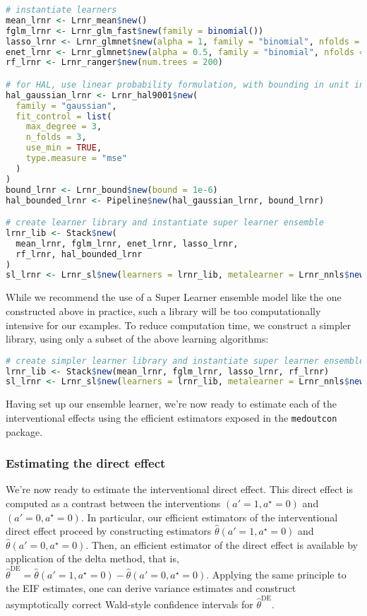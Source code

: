 \documentclass[
  12pt,
]{book}
\newcommand{\passthrough}[1]{#1}
\theoremstyle{definition}
\theoremstyle{definition}
\theoremstyle{definition}
\newcommand{\1}{\mathbbm{1}}
\begin{document}
\begin{lstlisting}[language=R]
# instantiate learners
mean_lrnr <- Lrnr_mean$new()
fglm_lrnr <- Lrnr_glm_fast$new(family = binomial())
lasso_lrnr <- Lrnr_glmnet$new(alpha = 1, family = "binomial", nfolds = 3)
enet_lrnr <- Lrnr_glmnet$new(alpha = 0.5, family = "binomial", nfolds = 3)
rf_lrnr <- Lrnr_ranger$new(num.trees = 200)

# for HAL, use linear probability formulation, with bounding in unit interval
hal_gaussian_lrnr <- Lrnr_hal9001$new(
  family = "gaussian",
  fit_control = list(
    max_degree = 3,
    n_folds = 3,
    use_min = TRUE,
    type.measure = "mse"
  )
)
bound_lrnr <- Lrnr_bound$new(bound = 1e-6)
hal_bounded_lrnr <- Pipeline$new(hal_gaussian_lrnr, bound_lrnr)

# create learner library and instantiate super learner ensemble
lrnr_lib <- Stack$new(
  mean_lrnr, fglm_lrnr, enet_lrnr, lasso_lrnr,
  rf_lrnr, hal_bounded_lrnr
)
sl_lrnr <- Lrnr_sl$new(learners = lrnr_lib, metalearner = Lrnr_nnls$new())
\end{lstlisting}

While we recommend the use of a Super Learner ensemble model like the one
constructed above in practice, such a library will be too computationally
intensive for our examples. To reduce computation time, we construct a simpler
library, using only a subset of the above learning algorithms:

\begin{lstlisting}[language=R]
# create simpler learner library and instantiate super learner ensemble
lrnr_lib <- Stack$new(mean_lrnr, fglm_lrnr, lasso_lrnr, rf_lrnr)
sl_lrnr <- Lrnr_sl$new(learners = lrnr_lib, metalearner = Lrnr_nnls$new())
\end{lstlisting}

Having set up our ensemble learner, we're now ready to estimate each of the
interventional effects using the efficient estimators exposed in the \passthrough{\lstinline!medoutcon!}
package.

\hypertarget{estimating-the-direct-effect-1}{%
\subsubsection{Estimating the direct effect}\label{estimating-the-direct-effect-1}}

We're now ready to estimate the interventional direct effect. This direct effect
is computed as a contrast between the interventions \((a' = 1, a^{\star} = 0)\)
and \((a' = 0, a^{\star} = 0)\). In particular, our efficient estimators of the
interventional direct effect proceed by constructing estimators
\(\hat{\theta}(a' = 1, a^{\star} = 0)\) and \(\hat{\theta}(a' = 0, a^{\star} = 0)\).
Then, an efficient estimator of the direct effect is available by application
of the delta method, that is, \(\hat{\theta}^{\text{DE}} = \hat{\theta}(a' = 1, a^{\star} = 0) - \hat{\theta}(a' = 0, a^{\star} = 0)\).
Applying the same principle to the EIF estimates, one can derive variance
estimates and construct asymptotically correct Wald-style confidence intervals
for \(\hat{\theta}^{\text{DE}}\).
\end{document}
